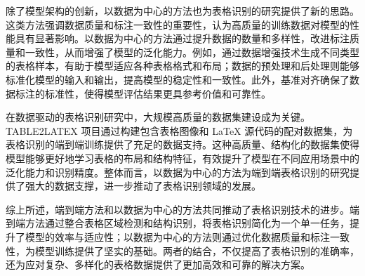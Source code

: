 \documentclass[UTF8,12pt, AutoFakeBold,fontset = founder]{ctexart}
\begin{document}
除了模型架构的创新，以数据为中心的方法也为表格识别的研究提供了新的思路。这类方法强调数据质量和标注一致性的重要性，认为高质量的训练数据对模型的性能具有显著影响。以数据为中心的方法通过提升数据的数量和多样性，改进标注质量和一致性，从而增强了模型的泛化能力。例如，通过数据增强技术生成不同类型的表格样本，有助于模型适应各种表格格式和布局；数据的预处理和后处理则能够标准化模型的输入和输出，提高模型的稳定性和一致性。此外，基准对齐确保了数据标注的标准性，使得模型评估结果更具参考价值和可靠性。

在数据驱动的表格识别研究中，大规模高质量的数据集建设成为关键。TABLE2LATEX 项目通过构建包含表格图像和 LaTeX 源代码的配对数据集，为表格识别的端到端训练提供了充足的数据支持。这种高质量、结构化的数据集使得模型能够更好地学习表格的布局和结构特征，有效提升了模型在不同应用场景中的泛化能力和识别精度。整体而言，以数据为中心的方法为端到端表格识别的研究提供了强大的数据支撑，进一步推动了表格识别领域的发展。

综上所述，端到端方法和以数据为中心的方法共同推动了表格识别技术的进步。端到端方法通过整合表格区域检测和结构识别，将表格识别简化为一个单一任务，提升了模型的效率与适应性；以数据为中心的方法则通过优化数据质量和标注一致性，为模型训练提供了坚实的基础。两者的结合，不仅提高了表格识别的准确率，还为应对复杂、多样化的表格数据提供了更加高效和可靠的解决方案。


\end{document}
